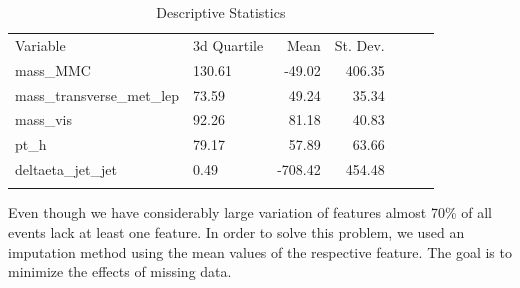 \documentclass[10pt,conference,compsocconf]{IEEEtran}
\begin{document}
\begin{table}[htb]	\label{Table2}
	\addtolength\tabcolsep{2pt}
	\caption{Descriptive Statistics}
	\addtolength\tabcolsep{2pt}
	\begin{tabular}{llrrrrr}
		\hline\noalign{\smallskip}
		Variable 	& 3d Quartile & Mean & St. Dev. \\
		\noalign{\smallskip}\hline\noalign{\smallskip}
mass_MMC   				&  130.61	 & -49.02 &406.35 \\
mass_transverse_met_lep	 	& 73.59 	& 49.24 &35.34 \\                        
mass_vis						 	&92.26 & 81.18 & 40.83\\                        
pt_h							& 79.17		& 57.89 & 63.66\\
deltaeta_jet_jet			 	&0.49		& -708.42 & 454.48 \\                         
		\noalign{\smallskip}\hline\noalign{\smallskip}\\
	\end{tabular}
\end{table}

Even though we have considerably large variation of features almost 70\% of all events lack at least one feature. In order to solve this problem, we used an imputation method using the mean values of the respective feature. The goal is to minimize the effects of missing data. 
\end{document}
